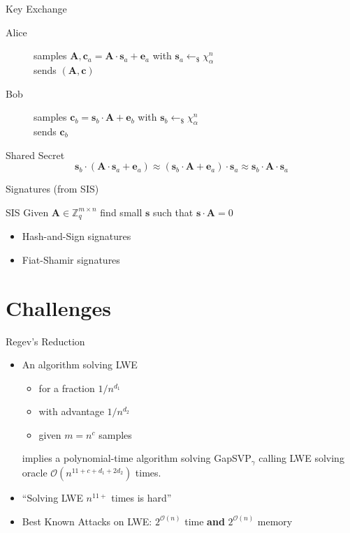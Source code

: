 \documentclass[presentation,smaller]{beamer}
\renewcommand{\vec}[1]{\ensuremath{\mathbf{#1}}\xspace}
\newcommand{\sample}{\ensuremath{\leftarrow_{\$}}}
\begin{document}
\begin{frame}[label={sec:orge9efbdd}]{Key Exchange }
\begin{description}
\item[{Alice}] samples \(\vec{A},\vec{c}_a=\vec{A}\cdot \vec{s}_a + \vec{e}_a\) with \(\vec{s}_a \sample χ_α^n\)  \\
sends \((\vec{A},\vec{c})\)
\item[{Bob}] samples \(\vec{c}_b=\vec{s}_b \cdot \vec{A} + \vec{e}_b\) with \(\vec{s}_b \sample χ_α^n\) \\
sends \(\vec{c}_b\)
\end{description}

\begin{block}{Shared Secret}
\[\vec{s}_b \cdot (\vec{A} \cdot \vec{s}_a + \vec{e}_a) \approx (\vec{s}_b \cdot \vec{A} + \vec{e}_a) \cdot \vec{s}_a \approx \vec{s}_b \cdot \vec{A} \cdot \vec{s}_a\]
\end{block}
\end{frame}

\begin{frame}[label={sec:orgada35b3}]{Signatures (from SIS)}
\begin{block}{SIS}
Given \(\vec{A} \in \mathbb{Z}_q^{m \times n}\) find \alert{small} \(\vec{s}\) such that \(\vec{s}⋅\vec{A} = 0\) 
\end{block}

\begin{itemize}
\item Hash-and-Sign signatures 

\item Fiat-Shamir signatures 
\end{itemize}
\end{frame}



\section{Challenges}
\label{sec:org4ea51c0}

\begin{frame}[label={sec:orgf28b335}]{Regev’s Reduction}
\begin{itemize}
\item<1-> An algorithm solving LWE 
\begin{itemize}
\item for a fraction \(1/n^{d_1}\)
\item with advantage \(1/n^{d_2}\)
\item given \(m = n^c\) samples
\end{itemize}
implies a polynomial-time algorithm solving GapSVP\(_γ\) calling LWE solving oracle \(\mathcal{O}(n^{11+c+d_1+2d_2})\) times.

\item<2-> “Solving LWE \(n^{11+}\) times is hard”

\item<3-> Best Known Attacks on LWE: \(2^{\mathcal{O}(n)}\) time \textbf{and} \(2^{\mathcal{O}(n)}\) memory
\end{itemize}
\end{frame}
\end{document}
